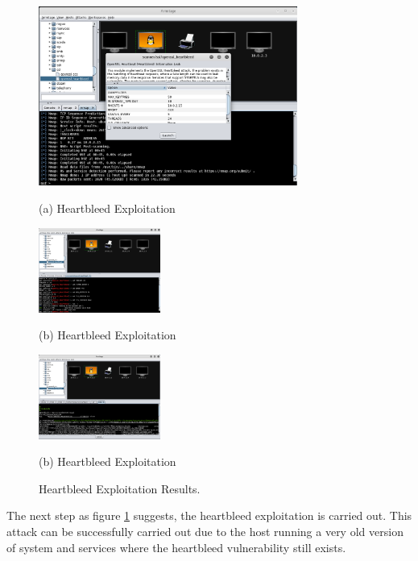 \documentclass{article}
\begin{document}
\begin{figure}[H]
  \begin{minipage}[b]{1.0\linewidth}
    \centering
    \centerline{\includegraphics[width=8.5cm]{kali4}}
    \centerline{(a) Heartbleed Exploitation}\medskip
  \end{minipage}

  \begin{minipage}[b]{.48\linewidth}
    \centering
    \centerline{\includegraphics[width=4.0cm]{kali5}}
    \centerline{(b) Heartbleed Exploitation}\medskip
  \end{minipage}
  \hfill
  \begin{minipage}[b]{0.48\linewidth}
    \centering
    \centerline{\includegraphics[width=4.0cm]{kali6}}
    \centerline{(b) Heartbleed Exploitation}\medskip
  \end{minipage}
  \caption{Heartbleed Exploitation Results.}
  \label{kali4-5-6}
  \end{figure}

The next step as figure \ref{kali4-5-6} suggests, the heartbleed exploitation is carried out. This attack 
can be successfully carried out due to the host running a very old version of system and services where 
the heartbleed vulnerability still exists.
\end{document}
